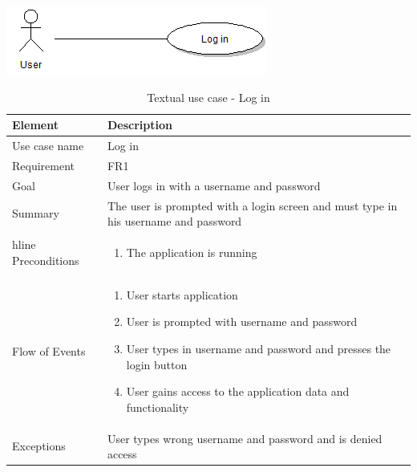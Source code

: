 \begin{table}
\begin{center}
\begin{center}
\includegraphics[width=\textwidth]{login}
\end{center}
\begin{tabular}{p{3cm}|p{12cm}} \hline
\textbf{Element} & \textbf{Description} \\ \hline \hline
Use case name & Log in \\ 
Requirement & FR1 \\
Goal & User logs in with a username and password \\ \hline
Summary &The user is prompted with a login screen and must type in his username and password \\hline
Preconditions &
\begin{enumerate}
\item{}The application is running
\end{enumerate} \\ \hline
Flow of Events &
\begin{enumerate}
\item{}User starts application
\item{}User is prompted with username and password
\item{}User types in username and password and presses the login button
\item{}User gains access to the application data and functionality
\end{enumerate} \\ \hline
Exceptions & User types wrong username and password and is denied access \\ \hline
\end{tabular}
\end{center}
\caption{Textual use case - Log in} \label{tab:login}
\end{table}

